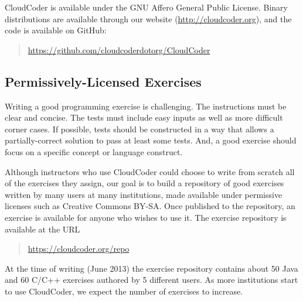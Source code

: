 \documentclass{sig-alternate}
\begin{document}
CloudCoder is available under the GNU Affero General Public License\cite{AGPL}.
Binary distributions are available through our website (\url{http://cloudcoder.org}),
and the code is available on GitHub:
\begin{quote}
\url{https://github.com/cloudcoderdotorg/CloudCoder}
\end{quote}


\subsection{Permissively-Licensed Exercises}

Writing a good programming exercise is challenging.
The instructions must be clear and concise.  The tests must
include easy inputs as well as more difficult corner cases.
If possible, tests should be constructed in a way that
allows a partially-correct solution to pass at least some
tests.  And, a good exercise should focus on a specific concept
or language construct.


Although instructors who use CloudCoder
could choose to write from scratch all of the exercises they assign,
our goal is to build a repository of good exercises
written by many users at many institutions, made available under
permissive licenses such as Creative Commons BY-SA\cite{CC-BY-SA}.
Once published to the repository, an exercise is available
for anyone who wishes to use it.
The exercise repository is available at the URL
\begin{quote}
\url{https://cloudcoder.org/repo}
\end{quote}
%
At the time of writing (June 2013) the exercise repository contains about 50 Java and
60 C/C++ exercises authored by 5 different users.  As more institutions
start to use CloudCoder, we expect the number of exercises to increase.
\end{document}
